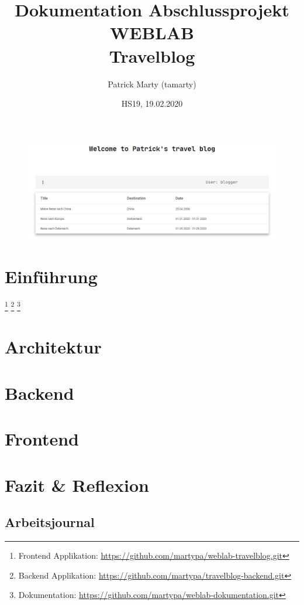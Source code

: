\documentclass{article}
\title{Dokumentation Abschlussprojekt WEBLAB \\
        \textbf{Travelblog}}
\author{Patrick Marty (tamarty)}
\date{HS19, 19.02.2020}
\begin{document}
\maketitle


\vspace{2cm}
\begin{figure}[h]
        \centering
        \includegraphics[width=1\textwidth]{blogDashboard.png}
\end{figure}

\vspace{1cm}

\section{Einführung}\label{einfuhrung}

\footnote{Frontend Applikation: \url{https://github.com/martypa/weblab-travelblog.git}}
\footnote{Backend Applikation:  \url{https://github.com/martypa/travelblog-backend.git}}
\footnote{Dokumentation:        \url{https://github.com/martypa/weblab-dokumentation.git}}
\newpage

\section{Architektur}\label{architektur}


\vspace{2cm}
\section{Backend}\label{backend}


\section{Frontend}\label{frontend}


\section{Fazit \& Reflexion}\label{fazit}

\newpage

\begin{landscape}
\section{Arbeitsjournal}\label{arbeitsjournal}

\end{landscape}
\end{document}
